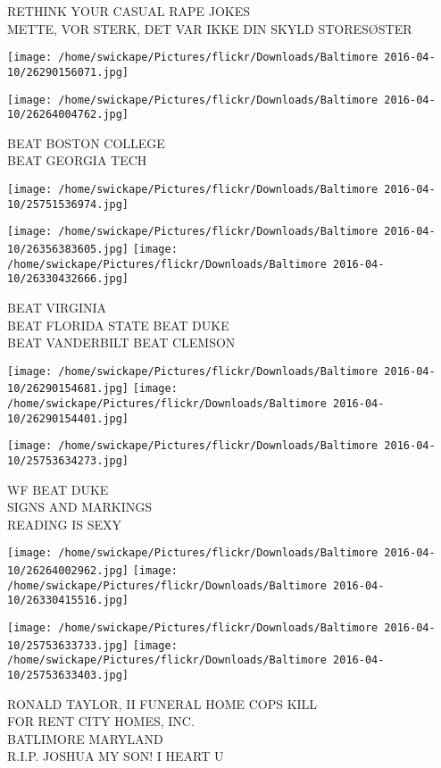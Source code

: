 \documentclass[10pt,letterpaper]{article}
\begin{document}
RETHINK YOUR CASUAL RAPE JOKES\\
METTE, VOR STERK, DET VAR IKKE DIN SKYLD STORESØSTER
\pagebreak

\texttt{[image: /home/swickape/Pictures/flickr/Downloads/Baltimore 2016-04-10/26290156071.jpg]}

\vspace{0.25in}
\texttt{[image: /home/swickape/Pictures/flickr/Downloads/Baltimore 2016-04-10/26264004762.jpg]}

BEAT BOSTON COLLEGE\\
BEAT GEORGIA TECH
\pagebreak

\texttt{[image: /home/swickape/Pictures/flickr/Downloads/Baltimore 2016-04-10/25751536974.jpg]}

\vspace{0.25in}
\texttt{[image: /home/swickape/Pictures/flickr/Downloads/Baltimore 2016-04-10/26356383605.jpg]}
\texttt{[image: /home/swickape/Pictures/flickr/Downloads/Baltimore 2016-04-10/26330432666.jpg]}

BEAT VIRGINIA\\
BEAT FLORIDA STATE BEAT DUKE\\
BEAT VANDERBILT BEAT CLEMSON
\pagebreak

\texttt{[image: /home/swickape/Pictures/flickr/Downloads/Baltimore 2016-04-10/26290154681.jpg]}
\texttt{[image: /home/swickape/Pictures/flickr/Downloads/Baltimore 2016-04-10/26290154401.jpg]}

\vspace{0.25in}
\texttt{[image: /home/swickape/Pictures/flickr/Downloads/Baltimore 2016-04-10/25753634273.jpg]}

WF BEAT DUKE\\
SIGNS AND MARKINGS\\
READING IS SEXY
\pagebreak

\texttt{[image: /home/swickape/Pictures/flickr/Downloads/Baltimore 2016-04-10/26264002962.jpg]}
\texttt{[image: /home/swickape/Pictures/flickr/Downloads/Baltimore 2016-04-10/26330415516.jpg]}

\texttt{[image: /home/swickape/Pictures/flickr/Downloads/Baltimore 2016-04-10/25753633733.jpg]}
\texttt{[image: /home/swickape/Pictures/flickr/Downloads/Baltimore 2016-04-10/25753633403.jpg]}

RONALD TAYLOR, II FUNERAL HOME COPS KILL\\
FOR RENT CITY HOMES, INC.\\
BATLIMORE MARYLAND\\
R.I.P. JOSHUA MY SON! I HEART U
\pagebreak
\end{document}
